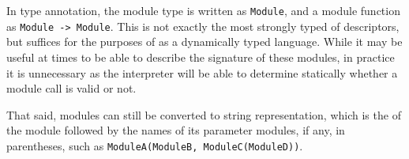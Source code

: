 In type annotation, the module type is written as \texttt{Module}, and a module function
as \texttt{Module -> Module}. This is not exactly the most strongly typed of descriptors,
but suffices for the purposes of \Trilogy{} as a dynamically typed language. While it may
be useful at times to be able to describe the signature of these modules, in practice it
is unnecessary as the interpreter will be able to determine statically whether a module
call is valid or not.

That said, modules can still be converted to string representation, which is the
of the module followed by the names of its parameter modules, if any, in parentheses,
such as \texttt{ModuleA(ModuleB, ModuleC(ModuleD))}.
